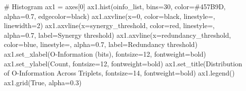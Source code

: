 \documentclass[
  11pt,
  letterpaper,
  oneside,
  openany]{book}
\newenvironment{Shaded}{\begin{snugshade}}{\end{snugshade}}
\newcommand{\CommentTok}[1]{\textcolor[rgb]{0.37,0.37,0.37}{#1}}
\newcommand{\DecValTok}[1]{\textcolor[rgb]{0.68,0.00,0.00}{#1}}
\newcommand{\FloatTok}[1]{\textcolor[rgb]{0.68,0.00,0.00}{#1}}
\newcommand{\NormalTok}[1]{\textcolor[rgb]{0.00,0.23,0.31}{#1}}
\newcommand{\OperatorTok}[1]{\textcolor[rgb]{0.37,0.37,0.37}{#1}}
\newcommand{\StringTok}[1]{\textcolor[rgb]{0.13,0.47,0.30}{#1}}
\newcommand{\VariableTok}[1]{\textcolor[rgb]{0.07,0.07,0.07}{#1}}
\begin{document}
\begin{Shaded}
\begin{Highlighting}[]
\CommentTok{\# Histogram}
\NormalTok{ax1 }\OperatorTok{=}\NormalTok{ axes[}\DecValTok{0}\NormalTok{]}
\NormalTok{ax1.hist(oinfo\_list, bins}\OperatorTok{=}\DecValTok{30}\NormalTok{, color}\OperatorTok{=}\StringTok{\textquotesingle{}\#457B9D\textquotesingle{}}\NormalTok{, alpha}\OperatorTok{=}\FloatTok{0.7}\NormalTok{, edgecolor}\OperatorTok{=}\StringTok{\textquotesingle{}black\textquotesingle{}}\NormalTok{)}
\NormalTok{ax1.axvline(x}\OperatorTok{=}\DecValTok{0}\NormalTok{, color}\OperatorTok{=}\StringTok{\textquotesingle{}black\textquotesingle{}}\NormalTok{, linestyle}\OperatorTok{=}\StringTok{\textquotesingle{}{-}\textquotesingle{}}\NormalTok{, linewidth}\OperatorTok{=}\DecValTok{2}\NormalTok{)}
\NormalTok{ax1.axvline(x}\OperatorTok{=}\NormalTok{synergy\_threshold, color}\OperatorTok{=}\StringTok{\textquotesingle{}red\textquotesingle{}}\NormalTok{, linestyle}\OperatorTok{=}\StringTok{\textquotesingle{}{-}{-}\textquotesingle{}}\NormalTok{, alpha}\OperatorTok{=}\FloatTok{0.7}\NormalTok{, label}\OperatorTok{=}\StringTok{\textquotesingle{}Synergy threshold\textquotesingle{}}\NormalTok{)}
\NormalTok{ax1.axvline(x}\OperatorTok{=}\NormalTok{redundancy\_threshold, color}\OperatorTok{=}\StringTok{\textquotesingle{}blue\textquotesingle{}}\NormalTok{, linestyle}\OperatorTok{=}\StringTok{\textquotesingle{}{-}{-}\textquotesingle{}}\NormalTok{, alpha}\OperatorTok{=}\FloatTok{0.7}\NormalTok{, label}\OperatorTok{=}\StringTok{\textquotesingle{}Redundancy threshold\textquotesingle{}}\NormalTok{)}
\NormalTok{ax1.set\_xlabel(}\StringTok{\textquotesingle{}O{-}Information (bits)\textquotesingle{}}\NormalTok{, fontsize}\OperatorTok{=}\DecValTok{12}\NormalTok{, fontweight}\OperatorTok{=}\StringTok{\textquotesingle{}bold\textquotesingle{}}\NormalTok{)}
\NormalTok{ax1.set\_ylabel(}\StringTok{\textquotesingle{}Count\textquotesingle{}}\NormalTok{, fontsize}\OperatorTok{=}\DecValTok{12}\NormalTok{, fontweight}\OperatorTok{=}\StringTok{\textquotesingle{}bold\textquotesingle{}}\NormalTok{)}
\NormalTok{ax1.set\_title(}\StringTok{\textquotesingle{}Distribution of O{-}Information Across Triplets\textquotesingle{}}\NormalTok{, fontsize}\OperatorTok{=}\DecValTok{14}\NormalTok{, fontweight}\OperatorTok{=}\StringTok{\textquotesingle{}bold\textquotesingle{}}\NormalTok{)}
\NormalTok{ax1.legend()}
\NormalTok{ax1.grid(}\VariableTok{True}\NormalTok{, alpha}\OperatorTok{=}\FloatTok{0.3}\NormalTok{)}


\end{Highlighting}
\end{Shaded}
\end{document}
